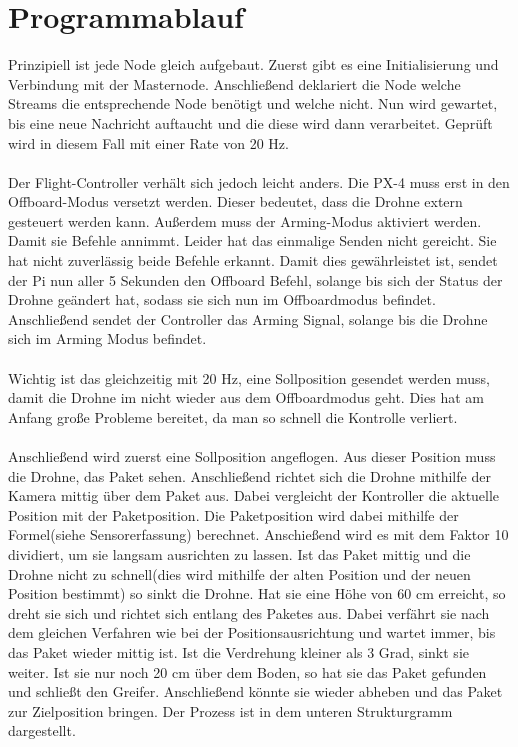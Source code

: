 \section{Programmablauf}
Prinzipiell ist jede Node gleich aufgebaut. Zuerst gibt es eine Initialisierung und Verbindung mit der Masternode. Anschließend deklariert die Node welche Streams die entsprechende Node benötigt und welche nicht. Nun wird gewartet, bis eine neue Nachricht auftaucht und die diese wird dann verarbeitet. Geprüft wird in diesem Fall mit einer Rate von 20 Hz. \\
\\
Der Flight-Controller verhält sich jedoch leicht anders. Die PX-4 muss erst in den Offboard-Modus versetzt werden. Dieser bedeutet, dass die Drohne extern gesteuert werden kann. Außerdem muss der Arming-Modus aktiviert werden. Damit sie Befehle annimmt. Leider hat das einmalige Senden nicht gereicht. Sie hat nicht zuverlässig beide Befehle erkannt. Damit dies gewährleistet ist, sendet der Pi nun aller 5 Sekunden den Offboard Befehl, solange bis sich der Status der Drohne geändert hat, sodass sie sich nun im Offboardmodus befindet. Anschließend sendet der Controller das Arming Signal, solange bis die Drohne sich im Arming Modus befindet.\\
\\
Wichtig ist das gleichzeitig mit 20 Hz, eine Sollposition gesendet werden muss, damit die Drohne im nicht wieder aus dem Offboardmodus geht. Dies hat am Anfang große Probleme bereitet, da man so schnell die Kontrolle verliert.\\
\\
Anschließend wird zuerst eine Sollposition angeflogen. Aus dieser Position muss die Drohne, das Paket sehen. Anschließend richtet sich die Drohne mithilfe der Kamera mittig über dem Paket aus. Dabei vergleicht der Kontroller die aktuelle Position mit der Paketposition. Die Paketposition wird dabei mithilfe der Formel(siehe Sensorerfassung) berechnet. Anschießend wird es mit dem Faktor 10 dividiert, um sie langsam ausrichten zu lassen. Ist das Paket mittig und die Drohne nicht zu schnell(dies wird mithilfe der alten Position und der neuen Position bestimmt) so sinkt die Drohne. Hat sie eine Höhe von 60 cm erreicht, so dreht sie sich und richtet sich entlang des Paketes aus. Dabei verfährt sie nach dem gleichen Verfahren wie bei der Positionsausrichtung und wartet immer, bis das Paket wieder mittig ist. Ist die Verdrehung kleiner als 3 Grad, sinkt sie weiter. Ist sie nur noch 20 cm über dem Boden, so hat sie das Paket gefunden und schließt den Greifer. Anschließend könnte sie wieder abheben und das Paket zur Zielposition bringen. Der Prozess ist in dem unteren Strukturgramm dargestellt. 

